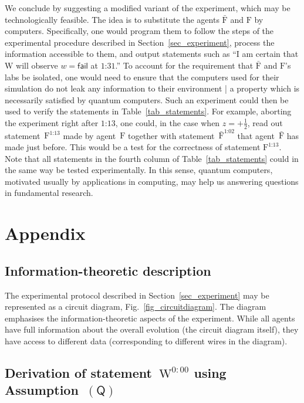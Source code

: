 \documentclass{article}
\theoremstyle{mystyle}
\theoremstyle{definition}
\newcommand*{\Friendone}{\mathrm{\bar{F}}}
\newcommand*{\Friendtwo}{\mathrm{F}}
\newcommand*{\Wigner}{\mathrm{W}}
\newcommand*{\splus}{{\textstyle + \frac{1}{2}}}
\newcommand*{\QT}{\mathsf{(Q)}}
\newcommand*{\fail}{\mathsf{fail}}
\begin{document}
We conclude by suggesting a modified variant of the experiment, which may be technologically feasible. The idea is to substitute the agents $\Friendone$ and $\Friendtwo$ by computers. Specifically, one would program them to follow the steps of the experimental procedure described in Section~\ref{sec_experiment},  process the information accessible to them, and output statements such as {``I am certain that $\Wigner$ will observe $w = \fail$ at $\text{1:31}$.''} To account for the requirement that $\Friendone$ and $\Friendtwo$'s labs be isolated, one would need to ensure that the computers used for their simulation do not leak any information to their environment | a property which is necessarily satisfied by quantum computers. Such an experiment could then be used to verify the statements in Table~\ref{tab_statements}. For example, aborting the experiment right after $\text{$1$:13}$, one could, in the case when $z=\splus$, read out  statement~$\Friendtwo^{\text{$1$:13}}$ made by agent~$\Friendtwo$ together with  statement~$\Friendone^{\text{$1$:02}}$ that agent~$\Friendone$ has made just before. This would be a test for the correctness of statement $\Friendtwo^{\text{$1$:13}}$. Note that all statements in the fourth column of Table~\ref{tab_statements} could in the same way be tested experimentally.  In this sense, quantum computers, motivated usually by applications in computing, may help us answering questions in fundamental research.  

\appendix

\section*{Appendix}

\setcounter{section}{1}

\subsection{Information-theoretic description} \label{app_diagram}

The experimental protocol described in Section~\ref{sec_experiment} may be represented as a circuit diagram, Fig.~\ref{fig_circuitdiagram}. The diagram emphasises the information-theoretic aspects of the experiment. While all agents have full information about the overall evolution (the circuit diagram itself), they have access to different data (corresponding to different wires in the diagram).

 
\subsection{Derivation of statement~$\Wigner^{\mathrm{0:00}}$ using Assumption~$\QT$} \label{app_statementW}
\end{document}
